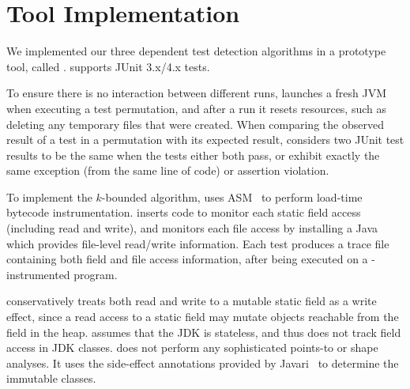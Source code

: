 \section{Tool Implementation}
\label{sec:impl}


We implemented our three dependent test detection algorithms in
a prototype tool, called \ourtool. \ourtool
supports JUnit 3.x/4.x tests. %

To ensure there is no interaction between
different runs, \ourtool launches a fresh JVM
when executing a test permutation, and after a run it resets resources,
such as deleting any temporary files that were created.
When comparing the observed result of
a test in a permutation with its expected result,
\ourtool considers two JUnit test results to be the same when the
tests either both pass, or exhibit exactly the same exception
(from the same line of code) or assertion violation.

To implement the \dependenceaware{} $k$-bounded
algorithm, \ourtool uses ASM~\cite{asm} to perform load-time bytecode
instrumentation. \ourtool inserts code to monitor each
static field access (including read and write), and
monitors each file access by
installing a Java  which provides 
file-level read/write information.
Each test produces a trace file containing both
field and file access information, after being executed
on a \ourtool-instrumented program.

\ourtool conservatively treats both read
and write to a mutable static field as a write effect,
since a read access to a static field may mutate objects
reachable from the field in the heap.
\ourtool assumes that the JDK is stateless,
and thus does not track field access in JDK classes. 
\ourtool does not perform any sophisticated points-to or shape
analyses. It uses the side-effect annotations
provided by Javari~\cite{QuinonezTE2008} to determine the immutable
classes.



